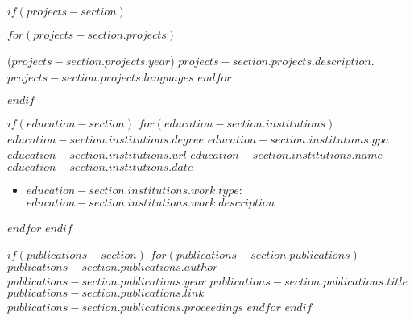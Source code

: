 $if(projects-section)$
\vspace{-15pt}
\begin{description}[align=left]
\setlength\itemsep{0pt}
$for(projects-section.projects)$
\item
[$projects-section.projects.name$]
($projects-section.projects.year$)
$projects-section.projects.description$.
$projects-section.projects.languages$
$endfor$
\end{description}
\vspace{-10pt}
$endif$

$if(education-section)$
$for(education-section.institutions)$
    \education
    {$education-section.institutions.degree$}
    {$education-section.institutions.gpa$}
    {$education-section.institutions.url$}
    {$education-section.institutions.name$}
    {$education-section.institutions.date$}
    \begin{itemize}
    \setlength\itemsep{0pt}
    \item
      $education-section.institutions.work.type$:
      $education-section.institutions.work.description$
    \end{itemize}
$endfor$
$endif$
\vspace{-15pt}

$if(publications-section)$
$for(publications-section.publications)$
\vspace{-15pt}
\publication
{$publications-section.publications.author$}
{$publications-section.publications.year$}
{$publications-section.publications.title$}
{$publications-section.publications.link$}
{$publications-section.publications.proceedings$}
$endfor$
$endif$



